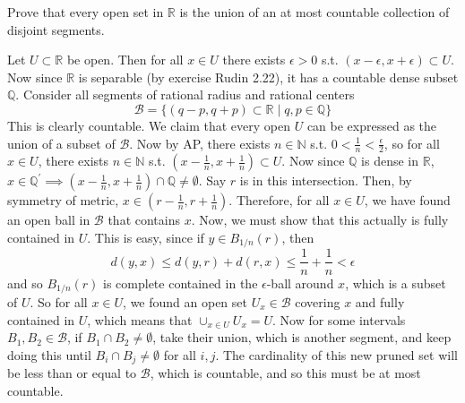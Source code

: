 \documentclass{article}
\begin{document}
    \begin{exercise}[Rudin 2.28]

    \end{exercise}

    \begin{exercise}[Rudin 2.29]
    Prove that every open set in $\mathbb{R}$ is the union of an at most countable collection of disjoint segments. 
    \end{exercise}
    \begin{solution}
    Let $U \subset \mathbb{R}$ be open. Then for all $x \in U$ there exists $\epsilon > 0$ s.t. $(x - \epsilon, x + \epsilon) \subset U$. Now since $\mathbb{R}$ is separable (by exercise Rudin 2.22), it has a countable dense subset $\mathbb{Q}$. Consider all segments of rational radius and rational centers 
    \[\mathscr{B} = \{ (q - p, q + p) \subset \mathbb{R} \mid q, p \in \mathbb{Q}\}\]
    This is clearly countable. We claim that every open $U$ can be expressed as the union of a subset of $\mathscr{B}$. Now by AP, there exists $n \in \mathbb{N}$ s.t. $0 < \frac{1}{n} < \frac{\epsilon}{2}$, so for all $x \in U$, there exists $n \in \mathbb{N}$ s.t. $(x - \frac{1}{n}, x + \frac{1}{n}) \subset U$. Now since $\mathbb{Q}$ is dense in $\mathbb{R}$, $x \in \mathbb{Q}^\prime \implies (x - \frac{1}{n}, x + \frac{1}{n}) \cap \mathbb{Q} \neq \emptyset$. Say $r$ is in this intersection. Then, by symmetry of metric, $x \in (r - \frac{1}{n}, r + \frac{1}{n})$. Therefore, for all $x \in U$, we have found an open ball in $\mathscr{B}$ that contains $x$. Now, we must show that this actually is fully contained in $U$. This is easy, since if $y \in B_{1/n} (r)$, then 
    \[d(y, x) \leq d(y, r) + d(r, x) \leq \frac{1}{n} + \frac{1}{n} < \epsilon\]
    and so $B_{1/n} (r)$ is complete contained in the $\epsilon$-ball around $x$, which is a subset of $U$. So for all $x \in U$, we found an open set $U_x \in \mathscr{B}$ covering $x$ and fully contained in $U$, which means that $\cup_{x \in U} U_x = U$. Now for some intervals $B_1, B_2 \in \mathscr{B}$, if $B_1 \cap B_2 \neq \emptyset$, take their union, which is another segment, and keep doing this until $B_i \cap B_j \neq \emptyset$ for all $i, j$. The cardinality of this new pruned set will be less than or equal to $\mathscr{B}$, which is countable, and so this must be at most countable. 
    \end{solution}
\end{document}
